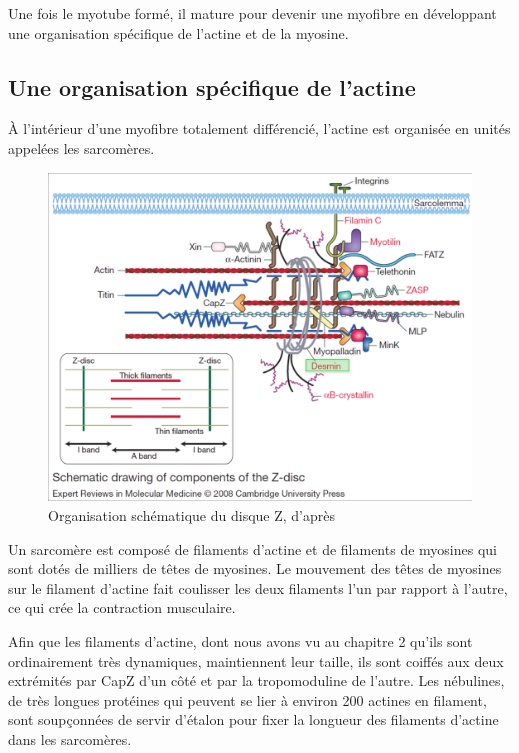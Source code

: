 \documentclass{report}
\begin{document}
Une fois le myotube formé, il mature pour devenir une myofibre en développant une organisation spécifique de l'actine et de la myosine.




\subsection{Une organisation spécifique de l'actine}

À l'intérieur d'une myofibre totalement différencié, l'actine est organisée en unités appelées les sarcomères. 

\begin{figure}
\includegraphics[scale=0.2]{Figures/sarcomere.png} 
\caption{Organisation schématique du disque Z, d'après \cite{ferrer_molecular_2008}}
\end{figure}

Un sarcomère est composé de filaments d'actine et de filaments de myosines qui sont dotés de milliers de têtes de myosines. Le mouvement des têtes de myosines sur le filament d'actine fait coulisser les deux filaments l'un par rapport à l'autre, ce qui crée la contraction musculaire. 

Afin que les filaments d'actine, dont nous avons vu au chapitre 2 qu'ils sont ordinairement très dynamiques, maintiennent leur taille, ils sont coiffés aux deux extrémités par CapZ d'un côté et par la tropomoduline de l'autre.
Les nébulines, de très longues protéines qui peuvent se lier à environ 200 actines en filament, sont soupçonnées de servir d'étalon pour fixer la longueur des filaments d'actine dans les sarcomères. 
\end{document}
